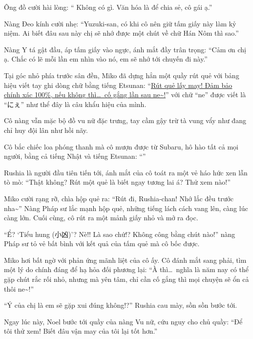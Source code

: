 \documentclass[../main.tex]{subfiles}
\begin{document}
Ông đồ cười hài lòng: ``{\color{red} Không có gì. Văn hóa là để chia sẻ, cô gái ạ.}''

Nàng Đeo kính cười nhẹ: ``Yuzuki-san, có khi cô nên giữ tấm giấy này làm kỷ niệm. Ai biết đâu sau này chị sẽ nhớ được một chút về chữ Hán Nôm thì sao.''

Nàng Y tá gật đầu, áp tấm giấy vào ngực, ánh mắt đầy trân trọng: ``Cảm ơn chị ạ. Chắc có lẽ mỗi lần em nhìn vào nó, em sẽ nhớ tới chuyến đi này.''

\ct

Tại góc nhỏ phía trước sân đền, Miko đã dựng hẳn một quầy rút quẻ với bảng hiệu viết tay ghi dòng chữ bằng tiếng Etsunan: ``\uline{Rút quẻ lấy may! Đảm bảo chính xác 100\%, nếu không thì\dots\ cố gắng lần sau ne\~{}!}'' với chữ ``ne'' được viết là ``にぇ'' như thể đây là câu khẩu hiệu của mình.

Cô nàng vẫn mặc bộ đồ vu nữ đặc trưng, tay cầm gậy trừ tà vung vẩy như đang chỉ huy đội lân như hồi nãy.

Cô bắc chiếc loa phóng thanh mà cô mượn được từ Subaru, hô hào tất cả mọi người, bằng cả tiếng Nhật và tiếng Etsunan: ``''

Rushia là người đầu tiên tiến tới, ánh mắt của cô toát ra một vẻ háo hức xen lẫn tò mò: ``Thật không? Rút một quẻ là biết ngay tương lai á? Thử xem nào!''

Miko cười rạng rỡ, chìa hộp quẻ ra: ``Rút đi, Rushia-chan! Nhớ lắc đều trước nha\~{}'' Nàng Pháp sư lắc mạnh hộp quẻ, những tiếng lách cách vang lên, càng lúc càng lớn. Cuối cùng, cô rút ra một mảnh giấy nhỏ và mở ra đọc.

``Ể? `Tiểu hung (小凶)'? Nè!! Là sao chứ!? Không công bằng chút nào!'' nàng Pháp sư tỏ vẻ bất bình với kết quả của tấm quẻ mà cô bốc được.

Miko hơi bất ngờ với phản ứng mãnh liệt của cô ấy. Cô đánh mắt sang phải, tìm một lý do chính đáng để hạ hỏa đối phương lại: ``À thì\dots\ nghĩa là năm nay có thể gặp chút rắc rối nhỏ, nhưng mà yên tâm, chỉ cần cố gắng thì mọi chuyện sẽ ổn cả thôi ne\~{}!''

``Ý của chị là em sẽ gặp xui đúng không!?'' Rushia cau mày, sồn sồn bước tới.

Ngay lúc này, Noel bước tới quầy của nàng Vu nữ, cứu nguy cho chủ quầy: ``Để tôi thử xem! Biết đâu vận may của tôi lại tốt hơn.''
\end{document}
